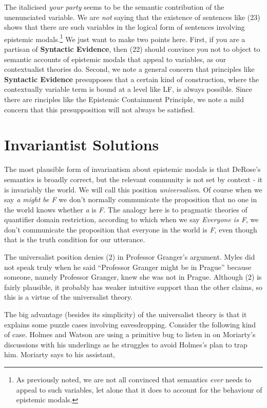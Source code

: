 \noindent The italicised \textit{your party} seems to be the semantic contribution of the unenunciated variable. We are \textit{not} saying that the existence of sentences like (23) shows that there are such variables in the logical form of sentences involving epistemic modals.\footnote{As previously noted, we are not all convinced that semantics \textit{ever} needs to appeal to such variables, let alone that it does to account for the behaviour of epistemic modals.} We just want to make two points here. First, if you are a partisan of \textbf{Syntactic Evidence}, then (22) should convince you not to object to semantic accounts of epistemic modals that appeal to variables, as our contextualist theories do. Second, we note a general concern that principles like \textbf{Syntactic Evidence} presupposes that a certain kind of construction, where the contextually variable term is bound at a level like LF, is always possible. Since there are rinciples like the Epistemic Containment Principle, we note a mild concern that this presupposition will not always be satisfied.
  
\section{Invariantist Solutions} 
 
The most plausible form of invariantism about epistemic modals is that DeRose's semantics is broadly correct, but the relevant community is not set by context - it is invariably the world. We will call this position \textit{universalism}. Of course when we say \textit{a might be F} we don't normally communicate the proposition that no one in the world knows whether \textit{a} is \textit{F}. The analogy here is to pragmatic theories of quantifier domain restriction, according to which when we say \textit{Everyone is F}, we don't communicate the proposition that everyone in the world is \textit{F}, even though that is the truth condition for our utterance.
 
The universalist position denies (2) in Professor Granger's argument. Myles did not speak truly when he said ``Professor Granger might be in Prague'' because someone, namely Professor Granger, knew she was not in Prague. Although (2) is fairly plausible, it probably has weaker intuitive support than the other claims, so this is a virtue of the universalist theory.
 
The big advantage (besides its simplicity) of the universalist theory is that it explains some puzzle cases involving eavesdropping. Consider the following kind of case. Holmes and Watson are using a primitive bug to listen in on Moriarty's discussions with his underlings as he struggles to avoid Holmes's plan to trap him. Moriarty says to his assistant,
 
